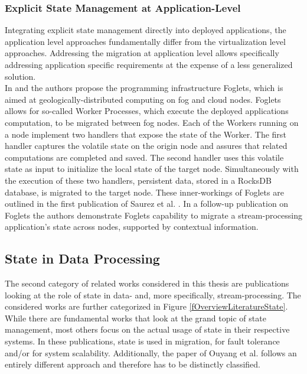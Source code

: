 \subsubsection{Explicit State Management at Application-Level}
\label{lMigrationApplicationLevel}
Integrating explicit state management directly into deployed applications, the application level approaches fundamentally differ from the virtualization level approaches. Addressing the migration at application level allows specifically addressing application specific requirements at the expense of a less generalized solution.\\
In \cite{Saurez.2016} and \cite{Saurez.2017} the authors propose the programming infrastructure Foglets, which is aimed at geologically-distributed computing on fog and cloud nodes. Foglets allows for so-called Worker Processes, which execute the deployed applications computation, to be migrated between fog nodes. Each of the Workers running on a node implement two handlers that expose the state of the Worker. The first handler captures the volatile state on the origin node and assures that related computations are completed and saved. The second handler uses this volatile state as input to initialize the local state of the target node. Simultaneously with the execution of these two handlers, persistent data, stored in a RocksDB database, is migrated to the target node. These inner-workings of Foglets are outlined in the first publication of Saurez et al. \cite{Saurez.2016}. In a follow-up publication on Foglets \cite{Saurez.2017} the authors demonstrate Foglets capability to migrate a stream-processing application's state across nodes, supported by contextual information.

\subsection{State in Data Processing}
\label{lStateDataProcessing}
The second category of related works considered in this thesis are publications looking at the role of state in data- and, more specifically, stream-processing. The considered works are further categorized in Figure \ref{fOverviewLiteratureState}. While there are fundamental works that look at the grand topic of state management, most others focus on the actual usage of state in their respective systems. In these publications, state is used in migration, for fault tolerance and/or for system scalability. Additionally, the paper of Ouyang et al. \cite{Ouyang.2011} follows an entirely different approach and therefore has to be distinctly classified.\par


